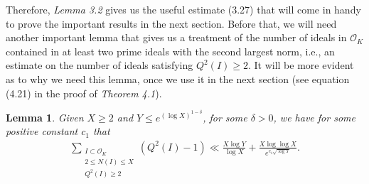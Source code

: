 \documentclass[12pt]{article}
\numberwithin{equation}{section}
\newtheorem{lemma}[theorem]{Lemma}
\numberwithin{equation}{section}
\begin{document}
\noindent Therefore, \textit{Lemma 3.2} gives us the useful estimate (3.27) that will come in handy to prove the important results in the next section. Before that, we will need another important lemma that gives us a treatment of the number of ideals in $\mathcal{O}_K$ contained in at least two prime ideals with the second largest norm, i.e., an estimate on the number of ideals satisfying $Q^2(I)\geq 2$. It will be more evident as to why we need this lemma, once we use it in the next section (see equation (4.21) in the proof of \textit{Theorem 4.1}).
\begin{lemma}
    Given $X \geq 2$ and $Y \leq e^{(\log X)^{1-\delta}}$, for some $\delta >0$, we have for some positive constant $c_1$ that
    \begin{align}
        \sum_{\substack{I \subset \mathcal{O}_K \\ 2 \leq N(I) \leq X \\ Q^2(I) \geq 2}}(Q^2(I)-1) \ll \frac{X\log Y}{\log X}+\frac{X\log\log X}{e^{c_1\sqrt{\log Y}}}. \nonumber
    \end{align}
\end{lemma}
\end{document}
